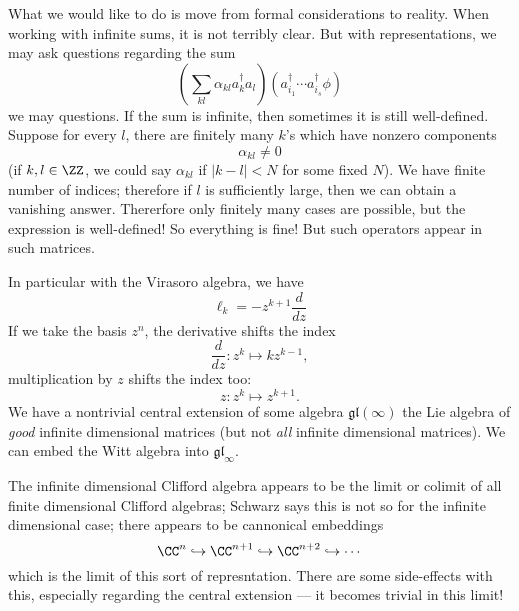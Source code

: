 What we would like to do is move from formal considerations to
reality. When working with infinite sums, it is not terribly
clear. But with representations, we may ask questions regarding
the sum
\begin{equation}
\left(\sum_{kl}\alpha_{kl}a^{\dagger}_{k}a_{l}\right)(a^{\dagger}_{i_{1}}\cdots
a^{\dagger}_{i_{s}}\phi)
\end{equation}
we may questions. If the sum is infinite, then sometimes it is
still well-defined. Suppose for every $l$, there are finitely
many $k$'s which have nonzero components
\begin{equation}
\alpha_{kl}\not=0
\end{equation}
(if $k,l\in\ZZ$, we could say $\alpha_{kl}$ if $|k-l|<N$ for some
fixed $N$). We have finite number of indices; therefore if $l$ is
sufficiently large, then we can obtain a vanishing
answer. Thererfore only finitely many cases are possible, but the
expression is well-defined! So everything is fine! But such
operators appear in such matrices.

In particular with the Virasoro algebra, we have
\begin{equation}
\ell_{k} = -z^{k+1}\frac{d}{dz}
\end{equation}
If we take the basis $z^{n}$, the derivative shifts the index
\begin{equation}
\frac{d}{dz}\colon z^{k}\mapsto kz^{k-1},
\end{equation}
multiplication by $z$ shifts the index too:
\begin{equation}
z\colon z^{k}\mapsto z^{k+1}.
\end{equation}
We have a nontrivial central extension of some algebra
$\mathfrak{gl}(\infty)$ the Lie algebra of \emph{good} infinite
dimensional matrices (but not \emph{all} infinite dimensional
matrices). We can embed the Witt algebra into $\mathfrak{gl}_{\infty}$.

\begin{rmk}
The infinite dimensional Clifford algebra appears to be the limit
or colimit of all finite dimensional Clifford algebras; Schwarz
says this is not so for the infinite dimensional case; there
appears to be cannonical embeddings
\begin{equation}
\CC^{n}\hookrightarrow\CC^{n+1}\hookrightarrow\CC^{n+2}\hookrightarrow\cdots
\end{equation}
which is the limit of this sort of represntation. There are some
side-effects with this, especially regarding the central
extension --- it becomes trivial in this limit!
\end{rmk}

